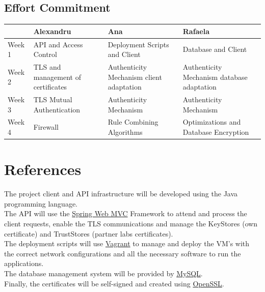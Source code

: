 \subsection{Effort Commitment}

\begin{tabularx}{0.8\textwidth} { 
  | >{\centering\arraybackslash}X 
  | >{\centering\arraybackslash}X 
  | >{\centering\arraybackslash}X 
  | >{\centering\arraybackslash}X | }
 \hline
  & Alexandru & Ana  & Rafaela \\
 \hline
 Week 1  & API and Access Control  & Deployment Scripts and Client  & Database and Client \\
  \hline
  Week 2  & TLS and management of certificates  & Authenticity Mechanism client adaptation  & Authenticity Mechanism database adaptation \\
   \hline
   Week 3  & TLS Mutual Authentication  & Authenticity Mechanism  & Authenticity Mechanism \\
    \hline
    Week 4  & Firewall  & Rule Combining Algorithms  & Optimizations and Database Encryption \\
\hline
\end{tabularx}

\section{References}

The project client and API infrastructure will be developed using the Java programming language. \\

The API will use the \href{https://docs.spring.io/spring-framework/docs/3.2.x/spring-framework-reference/html/mvc.html}{Spring Web MVC} Framework to attend and process the client requests, enable the TLS communications and manage the KeyStores (own certificate) and TrustStores (partner labs certificates). \\

The deployment scripts will use \href{https://www.vagrantup.com/}{Vagrant} to manage and deploy the VM's with the correct network configurations and all the necessary software to run the applications. \\

The database management system will be provided by \href{https://www.mysql.com/}{MySQL}. \\

Finally, the certificates will be self-signed and created using \href{https://www.openssl.org/}{OpenSSL}.
